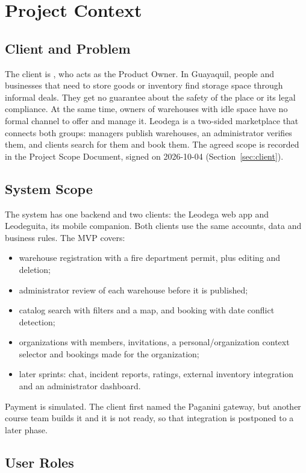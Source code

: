 \section{Project Context}
\label{sec:context}

\subsection{Client and Problem}

The client is \ClientName{}, who acts as the Product Owner.
In Guayaquil, people and businesses that need to store goods or inventory find storage space through informal deals.
They get no guarantee about the safety of the place or its legal compliance.
At the same time, owners of warehouses with idle space have no formal channel to offer and manage it.
Leodega is a two-sided marketplace that connects both groups: managers publish warehouses, an administrator verifies them, and clients search for them and book them.
The agreed scope is recorded in the Project Scope Document, signed on 2026-10-04 (Section~\ref{sec:client}).

\subsection{System Scope}

The system has one backend and two clients: the Leodega web app and Leodeguita, its mobile companion.
Both clients use the same accounts, data and business rules.
The MVP covers:
\begin{itemize}
  \item warehouse registration with a fire department permit, plus editing and deletion;
  \item administrator review of each warehouse before it is published;
  \item catalog search with filters and a map, and booking with date conflict detection;
  \item organizations with members, invitations, a personal/organization context selector and bookings made for the organization;
  \item later sprints: chat, incident reports, ratings, external inventory integration and an administrator dashboard.
\end{itemize}
Payment is simulated.
The client first named the Paganini gateway, but another course team builds it and it is not ready, so that integration is postponed to a later phase.

\subsection{User Roles}

